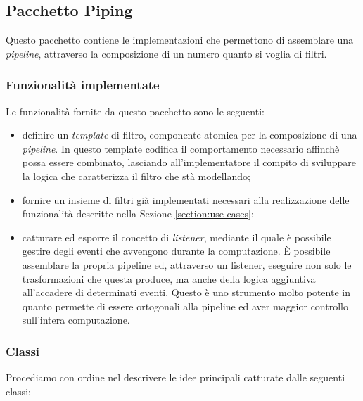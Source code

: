 \subsection{Pacchetto Piping}
\label{subsection:piping-package-description}
Questo pacchetto contiene le implementazioni che permettono di
assemblare una \emph{pipeline}, attraverso la composizione di un
numero quanto si voglia di filtri. 

\subsubsection*{Funzionalit\`a implementate}

Le funzionalit\`a fornite da questo pacchetto sono le seguenti:
\begin{itemize}
\item definire un \emph{template} di filtro, componente atomica per la
  composizione di una \emph{pipeline}. In questo template codifica il
  comportamento necessario affinch\`e possa essere combinato,
  lasciando all'implementatore il compito di sviluppare la logica che
  caratterizza il filtro che st\`a modellando;
\item fornire un insieme di filtri gi\`a implementati necessari alla
  realizzazione delle funzionalit\`a descritte nella Sezione
  \ref{section:use-cases};
\item catturare ed esporre il concetto di \emph{listener}, mediante il
  quale \`e possibile gestire degli eventi che avvengono durante la
  computazione. \`E possibile assemblare la propria pipeline ed,
  attraverso un listener, eseguire non solo le trasformazioni che
  questa produce, ma anche della logica aggiuntiva all'accadere di
  determinati eventi. Questo \`e uno strumento molto potente in quanto
  permette di essere ortogonali alla pipeline ed aver maggior
  controllo sull'intera computazione.
\end{itemize}

\subsubsection*{Classi}
Procediamo con ordine nel descrivere le idee principali catturate
dalle seguenti classi:

